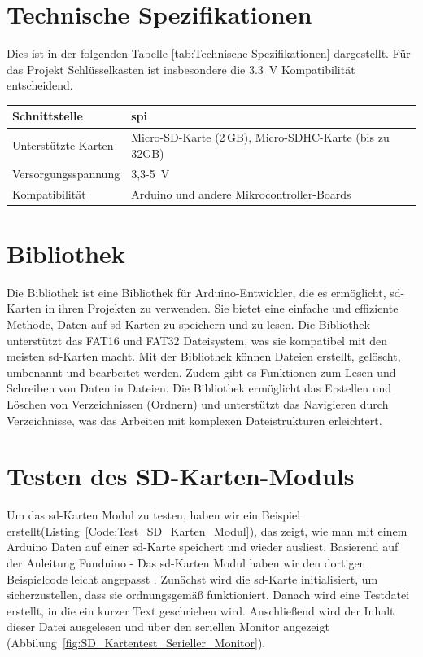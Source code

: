 \section{Technische Spezifikationen}

Dies ist in der folgenden Tabelle \ref{tab:Technische Spezifikationen} dargestellt. Für das Projekt Schlüsselkasten ist insbesondere die 3.3~V Kompatibilität entscheidend.

\begin{center}
	\label{tab:Technische Spezifikationen}
	\begin{tabular}{|l|l|}
		
		\hline
		Schnittstelle&\ac{spi} \\
		\hline
		Unterstützte Karten& Micro-SD-Karte (2\,GB), Micro-SDHC-Karte (bis zu 32GB) \\
		\hline
		Versorgungsspannung& 3,3-5~V \\
		\hline
		Kompatibilität&  Arduino und andere Mikrocontroller-Boards  \\
		\hline
	\end{tabular}
\end{center}


\section{Bibliothek }


Die  Bibliothek ist eine Bibliothek für Arduino-Entwickler, die es ermöglicht, \ac{sd}-Karten in ihren Projekten zu verwenden. Sie bietet eine einfache und effiziente Methode, Daten auf \ac{sd}-Karten zu speichern und zu lesen. Die Bibliothek unterstützt das FAT16 und FAT32 Dateisystem, was sie kompatibel mit den meisten \ac{sd}-Karten macht. Mit der  Bibliothek können Dateien erstellt, gelöscht, umbenannt und bearbeitet werden. Zudem gibt es Funktionen zum Lesen und Schreiben von Daten in Dateien. Die Bibliothek ermöglicht das Erstellen und Löschen von Verzeichnissen (Ordnern) und unterstützt das Navigieren durch Verzeichnisse, was das Arbeiten mit komplexen Dateistrukturen erleichtert.



\section{Testen des SD-Karten-Moduls}

Um das \ac{sd}-Karten Modul zu testen, haben wir ein Beispiel erstellt(Listing~\ref{Code:Test_SD_Karten_Modul}), das zeigt, wie man mit einem Arduino Daten auf einer \ac{sd}-Karte speichert und wieder ausliest. Basierend auf der Anleitung Funduino - Das \ac{sd}-Karten Modul haben wir den dortigen Beispielcode leicht angepasst \cite{AZDelivery2025}. Zunächst wird die \ac{sd}-Karte initialisiert, um sicherzustellen, dass sie ordnungsgemäß funktioniert. Danach wird eine Testdatei erstellt, in die ein kurzer Text geschrieben wird. Anschließend wird der Inhalt dieser Datei ausgelesen und über den seriellen Monitor angezeigt (Abbilung~\ref{fig:SD_Kartentest_Serieller_Monitor}).

